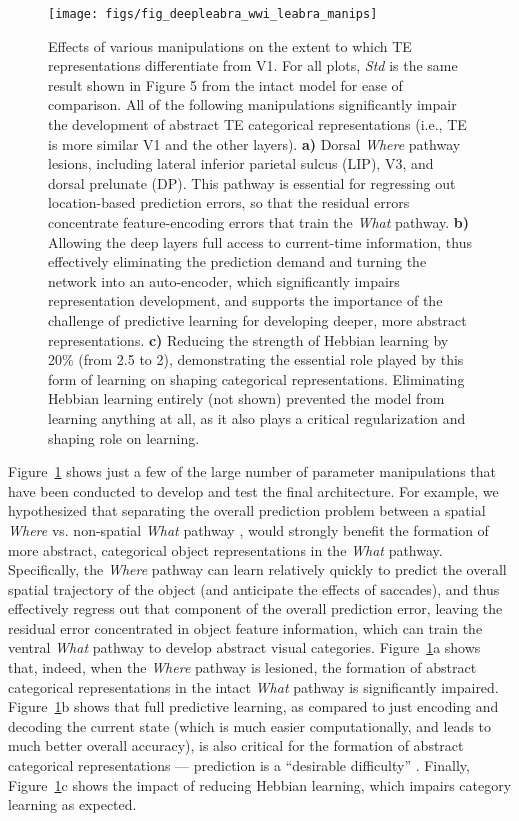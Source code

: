 \documentclass[11pt,twoside]{article}
\newif\myifpdf
\begin{document}
\begin{figure}
  \centering\texttt{[image: figs/fig\_deepleabra\_wwi\_leabra\_manips]}
  \caption{Effects of various manipulations on the extent to which TE representations differentiate from V1.  For all plots, \emph{Std} is the same result shown in Figure 5 from the intact model for ease of comparison.  All of the following  manipulations significantly impair the development of abstract TE categorical representations (i.e., TE is more similar V1 and the other layers).  {\bf a)} Dorsal \emph{Where} pathway lesions, including lateral inferior parietal sulcus (LIP), V3, and dorsal prelunate (DP).  This pathway is essential for regressing out location-based prediction errors, so that the residual errors concentrate feature-encoding errors that train the \emph{What} pathway.  {\bf b)} Allowing the deep layers full access to current-time information, thus effectively eliminating the prediction demand and turning the network into an auto-encoder, which significantly impairs representation development, and supports the importance of the challenge of predictive learning for developing deeper, more abstract representations.  {\bf c)} Reducing the strength of Hebbian learning by 20\% (from 2.5 to 2), demonstrating the essential role played by this form of learning on shaping categorical representations.  Eliminating Hebbian learning entirely (not shown) prevented the model from learning anything at all, as it also plays a critical regularization and shaping role on learning.}
  \label{fig.manips}
\end{figure}

Figure~\ref{fig.manips} shows just a few of the large number of parameter manipulations that have been conducted to develop and test the final architecture.  For example, we hypothesized that separating the overall prediction problem between a spatial \emph{Where} vs. non-spatial \emph{What} pathway \cite{UngerleiderMishkin82,GoodaleMilner92}, would strongly benefit the formation of more abstract, categorical object representations in the \emph{What} pathway.  Specifically, the \emph{Where} pathway can learn relatively quickly to predict the overall spatial trajectory of the object (and anticipate the effects of saccades), and thus effectively regress out that component of the overall prediction error, leaving the residual error concentrated in object feature information, which can train the ventral \emph{What} pathway to develop abstract visual categories.  Figure~\ref{fig.manips}a shows that, indeed, when the \emph{Where} pathway is lesioned, the formation of abstract categorical representations in the intact \emph{What} pathway is significantly impaired.  Figure~\ref{fig.manips}b shows that full predictive learning, as compared to just encoding and decoding the current state (which is much easier computationally, and leads to much better overall accuracy), is also critical for the formation of abstract categorical representations --- prediction is a ``desirable difficulty'' \cite{Bjork94}.  Finally, Figure~\ref{fig.manips}c shows the impact of reducing Hebbian learning, which impairs category learning as expected.
\end{document}
